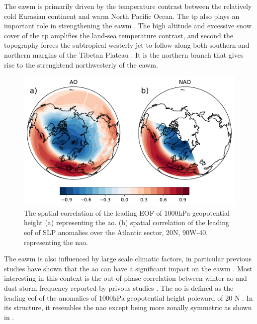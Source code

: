 The \acrshort{eawm} is primarily driven by the temperature contrast between the relatively cold Eurasian continent and warm North Pacific Ocean.
The \acrshort{tp} also plays an important role in strengthening the \acrshort{eawm} \parencite{tang2013strong}. 
The high altitude and excessive snow cover of the \acrshort{tp} amplifies the land-sea temperature contrast, and second the topography forces the subtropical westerly jet to follow along both southern and  northern margins of the Tibetan Plateau \parencite{tada2016evolution}. It is the northern branch that gives rise to the strenghtend northwesterly of the \acrshort{eawm}. 

\begin{figure}[htpb]
    \centering
    \includegraphics[width=\textwidth]{texfiles/figs/EOF_AO_NAO.pdf}
    \caption{The spatial correlation of the leading EOF of 1000hPa geopotential height (a) representing the \acrshort{ao}. (b)  spatial correlation of the leading \acrshort{eof}  of SLP anomalies over the Atlantic sector, 20\degree N, 90\degree W-40\degree, representing the \acrshort{nao}.}
    \label{fig:EOF_NAO_AO}
\end{figure}
The \acrshort{eawm} is also influenced by large scale climatic factors, in particular previous studies have shown that the \acrfull{ao} can have a significant impact on the \acrshort{eawm} \parencite{wu2002winter,park2011relationship}. 
Most interesting in this context is the out-of-phase correlation between winter \acrshort{ao} and dust storm frequency reported by privous studies \parencite{gong2006east,mao2011influence,liu2018influence}. 
The \acrshort{ao} is defined as the leading \acrfull{eof} of the anomalies of 1000hPa geopotential height poleward of 20 \degree N \parencite{thompson1998arctic}. 
In its structure, it resembles the \acrfull{nao} except being more zonally symmetric as shown in . 
